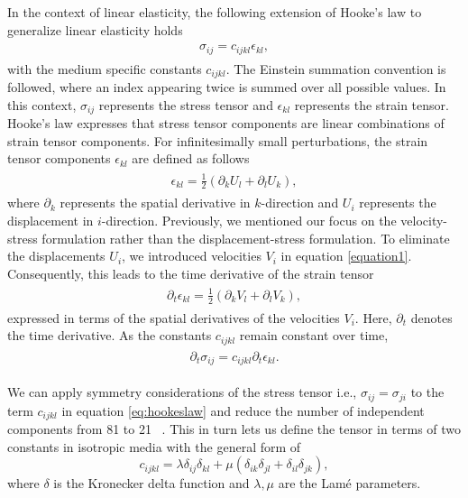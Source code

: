 In the context of linear elasticity, the following extension of Hooke's law  to generalize linear elasticity holds
\begin{align}
    \begin{split}
        \sigma_{ij} = c_{ijkl}\epsilon_{kl},
    \end{split}
    \label{eq:hookeslaw}
\end{align}
with the medium specific constants $c_{ijkl}$. The Einstein summation convention
is followed, where an index appearing twice is summed over all possible values. In this context, $\sigma_{ij}$ represents the stress tensor
and $\epsilon_{kl}$ represents the strain tensor. Hooke's law expresses that stress tensor components are linear combinations of strain tensor
components. For infinitesimally small perturbations, the strain tensor components $\epsilon_{kl}$ are defined as follows
\begin{align}
    \begin{split}
        \epsilon_{kl} = \frac{1}{2}\left(\partial_k U_l + \partial_l U_k \right) ,
    \end{split}
\end{align}
where $\partial_k$ represents the spatial derivative in $k$-direction and $U_i$ represents the displacement in $i$-direction.
Previously, we mentioned our focus on the velocity-stress formulation rather than the displacement-stress formulation.
To eliminate the displacements $U_i$, we introduced velocities $V_i$ in equation \ref{equation1}.
Consequently, this leads to the time derivative of the strain tensor
\begin{align}
    \begin{split}
        \partial_t \epsilon_{kl} = \frac{1}{2}\left(\partial_k V_l + \partial_l V_k \right) ,
    \end{split}
\end{align}
expressed in terms of the spatial derivatives of the velocities $V_i$. Here, $\partial_t$ denotes the time derivative. As the constants $c_{ijkl}$ remain constant over time,
\begin{align}
    \begin{split}
        \partial_t \sigma_{ij} = c_{ijkl} \partial_t {\epsilon}_{kl} .
    \end{split}
    \label{eq:stress}
\end{align}

We can apply symmetry considerations of the stress tensor i.e., $\sigma_{ij} = \sigma_{ji}$ to the term $c_{ijkl}$ in equation \ref{eq:hookeslaw} and reduce the number of independent components from 81 to 21 ~\parencite[Cha. 2]{aki2002quantitative}.
This in turn lets us define the tensor in terms of two constants in isotropic media with the general form of
\begin{equation}
    c_{ijkl} = \lambda \delta_{ij}\delta_{kl} + \mu\left(\delta_{ik}\delta_{jl} + \delta_{il}\delta_{jk}\right),
    \label{eq:isotropic}
\end{equation}
where $\delta$ is the Kronecker delta function and $\lambda, \mu$ are the Lam\'e parameters. \\

